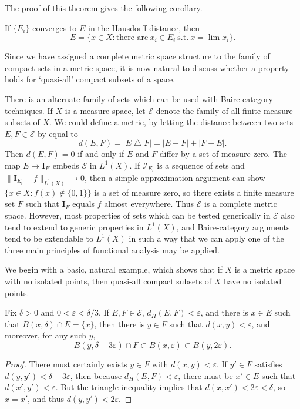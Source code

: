 The proof of this theorem gives the following corollary.

\begin{corollary}
	If $\{ E_i \}$ converges to $E$ in the Hausdorff distance, then
	\[ E = \{ x \in X : \text{there are}\ x_i \in E_i\ \text{s.t.}\ x = \lim x_i \}. \]
\end{corollary}

Since we have assigned a complete metric space structure to the family of compact sets in a metric space, it is now natural to discuss whether a property holds for `quasi-all' compact subsets of a space.

\begin{remark}
	There is an alternate family of sets which can be used with Baire category techniques. If $X$ is a measure space, let $\mathcal{E}$ denote the family of all finite measure subsets of $X$. We could define a metric, by letting the distance between two sets $E,F \in \mathcal{E}$ by equal to
	\[ d(E,F) = |E \bigtriangleup F| = |E - F| + |F - E|. \]
	Then $d(E,F) = 0$ if and only if $E$ and $F$ differ by a set of measure zero. The map $E \mapsto \mathbf{I}_E$ embeds $\mathcal{E}$ in $L^1(X)$. If $\mathcal{I}_{E_i}$ is a sequence of sets and $\| \mathbf{I}_{E_i} - f \|_{L^1(X)} \to 0$, then a simple approximation argument can show $\{ x \in X: f(x) \not \in \{ 0, 1 \} \}$ is a set of measure zero, so there exists a finite measure set $F$ such that $\mathbf{I}_F$ equals $f$ almost everywhere. Thus $\mathcal{E}$ is a complete metric space. However, most properties of sets which can be tested generically in $\mathcal{E}$ also tend to extend to generic properties in $L^1(X)$, and Baire-category arguments tend to be extendable to $L^1(X)$ in such a way that we can apply one of the three main principles of functional analysis may be applied.
\end{remark}

We begin with a basic, natural example, which shows that if $X$ is a metric space with no isolated points, then quasi-all compact subsets of $X$ have no isolated points.

\begin{lemma}
	Fix $\delta > 0$ and $0 < \varepsilon < \delta/3$. If $E,F \in \mathcal{E}$, $d_H(E,F) < \varepsilon$, and there is $x \in E$ such that $B(x,\delta) \cap E = \{ x \}$, then there is $y \in F$ such that $d(x,y) < \varepsilon$, and moreover, for any such $y$,
	\[ B(y,\delta - 3\varepsilon) \cap F \subset B(x,\varepsilon) \subset B(y,2\varepsilon). \]
\end{lemma}
\begin{proof}
	There must certainly exists $y \in F$ with $d(x,y) < \varepsilon$. If $y' \in F$ satisfies $d(y,y') < \delta - 3\varepsilon$, then because $d_H(E,F) < \varepsilon$, there must be $x' \in E$ such that $d(x',y') < \varepsilon$. But the triangle inequality implies that $d(x,x') < 2\varepsilon < \delta$, so $x = x'$, and thus $d(y,y') < 2\varepsilon$.
\end{proof}

